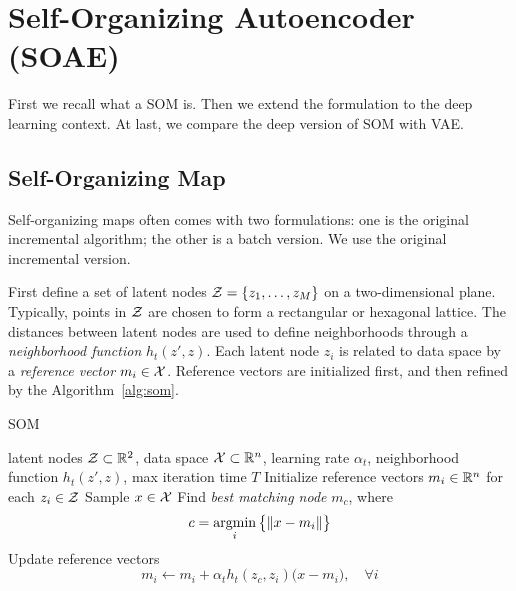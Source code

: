 \section{Self-Organizing Autoencoder (SOAE)}\label{sec:soae}

First we recall what a SOM is.
Then we extend the formulation to the deep learning context.
At last,
we compare the deep version of SOM with VAE\@.

\subsection{Self-Organizing Map}

Self-organizing maps often comes with two formulations:
one is the original incremental algorithm;
the other is a batch version.
We use the original incremental version.

First define a set of latent nodes
\( \mathcal{Z}=\{z_1,\dots,z_M\} \)
on a two-dimensional plane.
Typically,
points in \( \mathcal{Z} \) are chosen to form a rectangular or hexagonal lattice.
The distances between latent nodes are used to define neighborhoods
through a \emph{neighborhood function} \( h_t(z',z) \).
Each latent node \( z_i \) is related to data space by a \emph{reference vector}
\( m_i\in\mathcal{X} \).
Reference vectors are initialized first,
and then refined by the Algorithm~\ref{alg:som}.

\begin{algorithm}[tb]
    \caption{SOM~\cite{kohonen1982self, kohonen1998self}}\label{alg:som}
 \begin{algorithmic}
        latent nodes \(\mathcal{Z}\subset{\mathbb{R}}^2\),
        data space \(\mathcal{X}\subset{\mathbb{R}}^n\),
        learning rate \(\alpha_t\),
        neighborhood function \(h_t(z',z)\),
        max iteration time \(T\)
    \STATE
    \STATE Initialize reference vectors \(m_i\in{\mathbb{R}}^n\) for each \(z_i\in\mathcal{Z}\)
    \STATE Sample \(x\in\mathcal{X}\)
    \STATE Find \emph{best matching node} \(m_c\),
        where
        \begin{equation}
            c = \mathop{\mathrm{argmin}}_i \big\{\|x-m_i\|\big\}
        \end{equation}
    \STATE Update reference vectors
        \begin{equation}\label{eq:som_update}
            m_i \leftarrow m_i + \alpha_t h_t(z_c,z_i)\big(x-m_i\big),\quad\forall i
        \end{equation}
    \ENDFOR
\end{algorithmic}
\end{algorithm}

